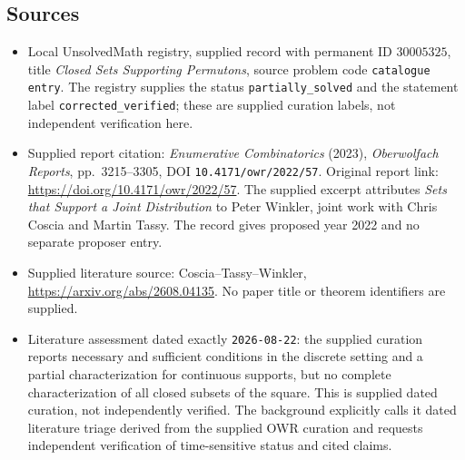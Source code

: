 \documentclass[11pt]{article}
\begin{document}
\subsection{Sources}
\begin{itemize}
\item Local UnsolvedMath registry, supplied record with permanent ID \(30005325\), title \emph{Closed Sets Supporting Permutons}, source problem code \texttt{catalogue entry}. The registry supplies the status \texttt{partially\_solved} and the statement label \texttt{corrected\_verified}; these are supplied curation labels, not independent verification here.
\item Supplied report citation: \emph{Enumerative Combinatorics} (2023), \emph{Oberwolfach Reports}, pp.\ 3215--3305, DOI \texttt{10.4171/owr/2022/57}. Original report link: \url{https://doi.org/10.4171/owr/2022/57}. The supplied excerpt attributes \emph{Sets that Support a Joint Distribution} to Peter Winkler, joint work with Chris Coscia and Martin Tassy. The record gives proposed year 2022 and no separate proposer entry.
\item Supplied literature source: Coscia--Tassy--Winkler, \url{https://arxiv.org/abs/2608.04135}. No paper title or theorem identifiers are supplied.
\item Literature assessment dated exactly \texttt{2026-08-22}: the supplied curation reports necessary and sufficient conditions in the discrete setting and a partial characterization for continuous supports, but no complete characterization of all closed subsets of the square. This is supplied dated curation, not independently verified. The background explicitly calls it dated literature triage derived from the supplied OWR curation and requests independent verification of time-sensitive status and cited claims.
\end{itemize}
\end{document}
